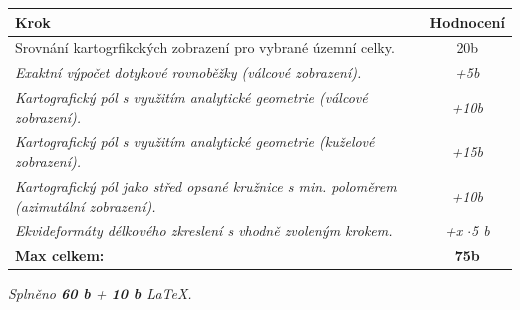 \noindent
\begin{tabularx}{\textwidth}{|X|c|}
    \hline
    \textbf{Krok} & \textbf{Hodnocení} \\
    \hline\hline
    {Srovnání kartogrfikckých zobrazení pro vybrané územní celky.} \cellcolor[HTML]{94F29E} & 20b \\
    \hline
    \textit{Exaktní výpočet dotykové rovnoběžky (válcové zobrazení).} \cellcolor[HTML]{94F29E} & \textit{+5b} \\
    \hline
    \textit{Kartografický pól s využitím analytické geometrie (válcové zobrazení).} \cellcolor[HTML]{94F29E} & \textit{+10b} \\
    \hline
    \textit{Kartografický pól s využitím analytické geometrie (kuželové zobrazení).} \cellcolor[HTML]{94F29E} & \textit{+15b} \\
    \hline
    \textit{Kartografický pól jako střed opsané kružnice s min. poloměrem (azimutální zobrazení).} \cellcolor[HTML]{94F29E} & \textit{+10b} \\
    \hline
    \textit{Ekvideformáty délkového zkreslení s vhodně zvoleným krokem.}  & \textit{+x $\cdot$5 b} \\
    \hline
    \textbf{Max celkem:} & \textbf{75b} \\
    \hline
    
\end{tabularx}

\textit{Splněno \textbf{60 b} + \textbf{10 b} LaTeX.}


